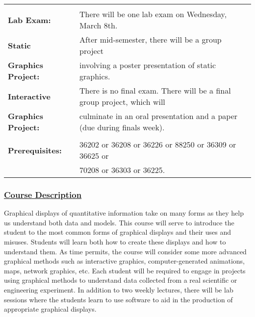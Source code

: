 \documentclass[11pt]{article}
\begin{document}
\begin{tabular}{ll}
\vspace*{.05in}\\



{\bf Lab Exam:} & There will be one lab exam on Wednesday, March 8th.

\vspace*{.05in}\\

{\bf Static} & After mid-semester, there will be a group project\\
{\bf Graphics Project:}
 & involving a poster presentation of static graphics.

\vspace*{.15in}\\

{\bf Interactive} & There is no final exam.  There will be a final group project, which will \\ 
{\bf Graphics Project:} & culminate in an oral presentation and a paper (due during finals week).\\


\vspace*{.05in}\\

 {\bf Prerequisites:} 
& 36202 or 36208 or 36226 or 88250 or 36309 or 36625 or \\ & 70208 or 36303 or 36225.\\







\end{tabular}


\subsubsection*{\underline{Course Description}}

Graphical displays of quantitative information take on many forms as they help us understand both data and models. This course will serve to introduce the student to the most common forms of graphical displays and their uses and misuses. Students will learn both how to create these displays and how to understand them. As time permits, the course will consider some more advanced graphical methods such as interactive graphics, computer-generated animations, maps, network graphics, etc. Each student will be required to engage in projects using graphical methods to understand data collected from a real scientific or engineering experiment. In addition to two weekly lectures, there will be lab sessions where the students learn to use software to aid in the production of appropriate graphical displays.
 
\end{document}
